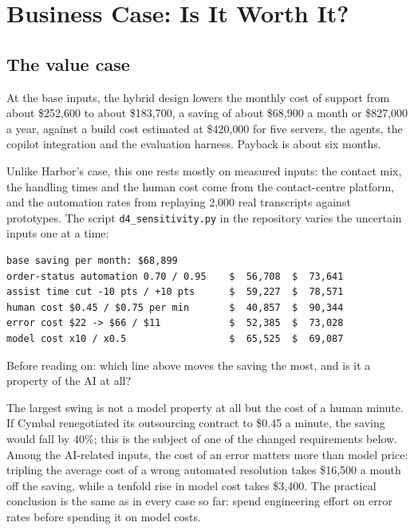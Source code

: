 
\section{Business Case: Is It Worth It?}
\label{sec:support-business}

\subsection{The value case}

At the base inputs, the hybrid design lowers the monthly cost of support from about \$252{,}600 to about \$183{,}700, a saving of about \$68{,}900 a month or \$827{,}000 a year, against a build cost estimated at \$420{,}000 for five servers, the agents, the copilot integration and the evaluation harness. Payback is about six months.

Unlike Harbor's case, this one rests mostly on measured inputs: the contact mix, the handling times and the human cost come from the contact-centre platform, and the automation rates from replaying 2{,}000 real transcripts against prototypes. The script \texttt{d4\_sensitivity.py} in the repository varies the uncertain inputs one at a time:

\begin{lstlisting}[language={}, numbers=none, frame=none, xleftmargin=1.5em]
base saving per month: $68,899
order-status automation 0.70 / 0.95    $  56,708  $  73,641
assist time cut -10 pts / +10 pts      $  59,227  $  78,571
human cost $0.45 / $0.75 per min       $  40,857  $  90,344
error cost $22 -> $66 / $11            $  52,385  $  73,028
model cost x10 / x0.5                  $  65,525  $  69,087
\end{lstlisting}

\begin{quickcheck}
Before reading on: which line above moves the saving the most, and is it a property of the AI at all?
\end{quickcheck}

The largest swing is not a model property at all but the cost of a human minute. If Cymbal renegotiated its outsourcing contract to \$0.45 a minute, the saving would fall by 40\%; this is the subject of one of the changed requirements below. Among the AI-related inputs, the cost of an error matters more than model price: tripling the average cost of a wrong automated resolution takes \$16{,}500 a month off the saving, while a tenfold rise in model cost takes \$3{,}400. The practical conclusion is the same as in every case so far: spend engineering effort on error rates before spending it on model costs.

